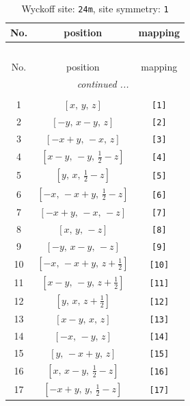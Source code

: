 \documentclass[fleqn,8pt]{jsarticle}
\begin{document}
\begin{longtable}{ccc}
\caption{Wyckoff site: {\tt 24m}, site symmetry: {\tt 1}}
 \\
 \hline \hline
No. & position & mapping \\ \hline \endfirsthead

\multicolumn{2}{l}{\tablename\ \thetable{}} \\
 \hline \hline
No. & position & mapping \\ \hline \endhead

 \hline \hline
\multicolumn{2}{r}{\footnotesize\it continued ...} \\ \endfoot

 \hline \hline
\multicolumn{2}{r}{} \\ \endlastfoot

1 & $\left[ x,\, y,\, z \right]$ & {\tt [1]} \\ \hline
2 & $\left[ - y,\, x - y,\, z \right]$ & {\tt [2]} \\ \hline
3 & $\left[ - x + y,\, - x,\, z \right]$ & {\tt [3]} \\ \hline
4 & $\left[ x - y,\, - y,\, \frac{1}{2} - z \right]$ & {\tt [4]} \\ \hline
5 & $\left[ y,\, x,\, \frac{1}{2} - z \right]$ & {\tt [5]} \\ \hline
6 & $\left[ - x,\, - x + y,\, \frac{1}{2} - z \right]$ & {\tt [6]} \\ \hline
7 & $\left[ - x + y,\, - x,\, - z \right]$ & {\tt [7]} \\ \hline
8 & $\left[ x,\, y,\, - z \right]$ & {\tt [8]} \\ \hline
9 & $\left[ - y,\, x - y,\, - z \right]$ & {\tt [9]} \\ \hline
10 & $\left[ - x,\, - x + y,\, z + \frac{1}{2} \right]$ & {\tt [10]} \\ \hline
11 & $\left[ x - y,\, - y,\, z + \frac{1}{2} \right]$ & {\tt [11]} \\ \hline
12 & $\left[ y,\, x,\, z + \frac{1}{2} \right]$ & {\tt [12]} \\ \hline
13 & $\left[ x - y,\, x,\, z \right]$ & {\tt [13]} \\ \hline
14 & $\left[ - x,\, - y,\, z \right]$ & {\tt [14]} \\ \hline
15 & $\left[ y,\, - x + y,\, z \right]$ & {\tt [15]} \\ \hline
16 & $\left[ x,\, x - y,\, \frac{1}{2} - z \right]$ & {\tt [16]} \\ \hline
17 & $\left[ - x + y,\, y,\, \frac{1}{2} - z \right]$ & {\tt [17]} \\ \hline

\end{longtable}
\end{document}
